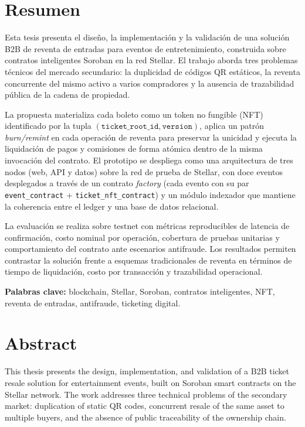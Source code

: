 \newpage
\section*{Resumen}

Esta tesis presenta el diseño, la implementación y la validación de una solución B2B de reventa de entradas para eventos de entretenimiento, construida sobre contratos inteligentes Soroban en la red Stellar. El trabajo aborda tres problemas técnicos del mercado secundario: la duplicidad de códigos QR estáticos, la reventa concurrente del mismo activo a varios compradores y la ausencia de trazabilidad pública de la cadena de propiedad.

La propuesta materializa cada boleto como un token no fungible (NFT) identificado por la tupla \((\texttt{ticket\_root\_id}, \texttt{version})\), aplica un patrón \textit{burn/remint} en cada operación de reventa para preservar la unicidad y ejecuta la liquidación de pagos y comisiones de forma atómica dentro de la misma invocación del contrato. El prototipo se despliega como una arquitectura de tres nodos (web, API y datos) sobre la red de prueba de Stellar, con doce eventos desplegados a través de un contrato \textit{factory} (cada evento con su par \texttt{event\_contract} + \texttt{ticket\_nft\_contract}) y un módulo indexador que mantiene la coherencia entre el ledger y una base de datos relacional.

La evaluación se realiza sobre testnet con métricas reproducibles de latencia de confirmación, costo nominal por operación, cobertura de pruebas unitarias y comportamiento del contrato ante escenarios antifraude. Los resultados permiten contrastar la solución frente a esquemas tradicionales de reventa en términos de tiempo de liquidación, costo por transacción y trazabilidad operacional.

\vspace{0.3cm}
\noindent\textbf{Palabras clave:} blockchain, Stellar, Soroban, contratos inteligentes, NFT, reventa de entradas, antifraude, ticketing digital.

\newpage
\section*{Abstract}

This thesis presents the design, implementation, and validation of a B2B ticket resale solution for entertainment events, built on Soroban smart contracts on the Stellar network. The work addresses three technical problems of the secondary market: duplication of static QR codes, concurrent resale of the same asset to multiple buyers, and the absence of public traceability of the ownership chain.

